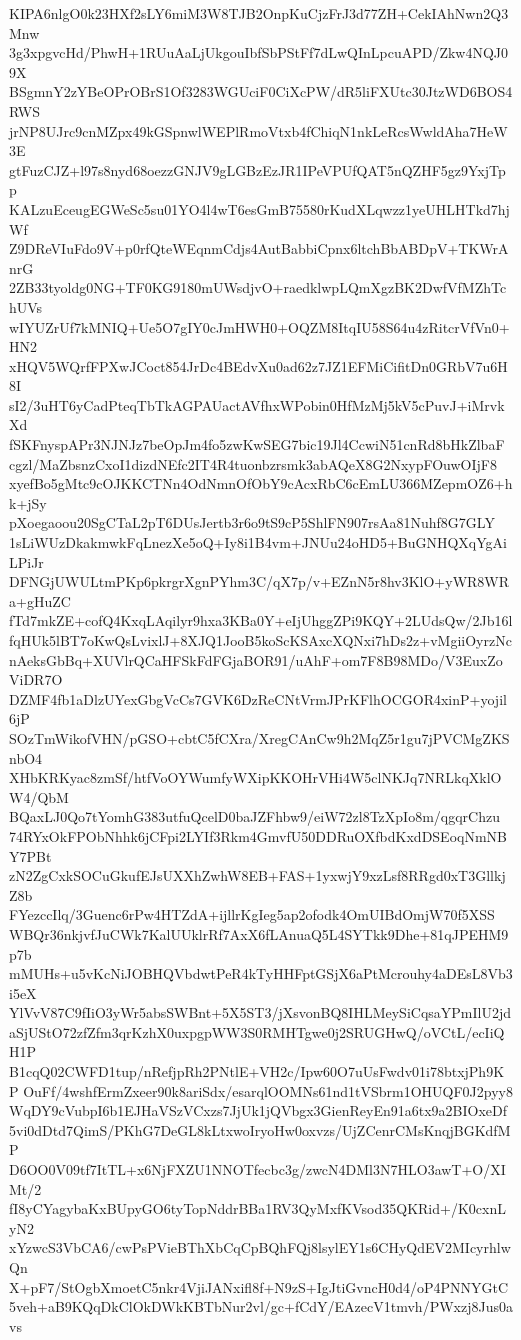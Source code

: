 KIPA6nlgO0k23HXf2sLY6miM3W8TJB2OnpKuCjzFrJ3d77ZH+CekIAhNwn2Q3Mnw
3g3xpgvcHd/PhwH+1RUuAaLjUkgouIbfSbPStFf7dLwQInLpcuAPD/Zkw4NQJ09X
BSgmnY2zYBeOPrOBrS1Of3283WGUciF0CiXcPW/dR5liFXUtc30JtzWD6BOS4RWS
jrNP8UJrc9cnMZpx49kGSpnwlWEPlRmoVtxb4fChiqN1nkLeRcsWwldAha7HeW3E
gtFuzCJZ+l97s8nyd68oezzGNJV9gLGBzEzJR1IPeVPUfQAT5nQZHF5gz9YxjTpp
KALzuEceugEGWeSc5su01YO4l4wT6esGmB75580rKudXLqwzz1yeUHLHTkd7hjWf
Z9DReVIuFdo9V+p0rfQteWEqnmCdjs4AutBabbiCpnx6ltchBbABDpV+TKWrAnrG
2ZB33tyoldg0NG+TF0KG9180mUWsdjvO+raedklwpLQmXgzBK2DwfVfMZhTchUVs
wIYUZrUf7kMNIQ+Ue5O7gIY0cJmHWH0+OQZM8ItqIU58S64u4zRitcrVfVn0+HN2
xHQV5WQrfFPXwJCoct854JrDc4BEdvXu0ad62z7JZ1EFMiCifitDn0GRbV7u6H8I
sI2/3uHT6yCadPteqTbTkAGPAUactAVfhxWPobin0HfMzMj5kV5cPuvJ+iMrvkXd
fSKFnyspAPr3NJNJz7beOpJm4fo5zwKwSEG7bic19Jl4CcwiN51cnRd8bHkZlbaF
cgzl/MaZbsnzCxoI1dizdNEfc2IT4R4tuonbzrsmk3abAQeX8G2NxypFOuwOIjF8
xyefBo5gMtc9cOJKKCTNn4OdNmnOfObY9cAcxRbC6cEmLU366MZepmOZ6+hk+jSy
pXoegaoou20SgCTaL2pT6DUsJertb3r6o9tS9cP5ShlFN907rsAa81Nuhf8G7GLY
1sLiWUzDkakmwkFqLnezXe5oQ+Iy8i1B4vm+JNUu24oHD5+BuGNHQXqYgAiLPiJr
DFNGjUWULtmPKp6pkrgrXgnPYhm3C/qX7p/v+EZnN5r8hv3KlO+yWR8WRa+gHuZC
fTd7mkZE+cofQ4KxqLAqilyr9hxa3KBa0Y+eIjUhggZPi9KQY+2LUdsQw/2Jb16l
fqHUk5lBT7oKwQsLvixlJ+8XJQ1JooB5koScKSAxcXQNxi7hDs2z+vMgiiOyrzNc
nAeksGbBq+XUVlrQCaHFSkFdFGjaBOR91/uAhF+om7F8B98MDo/V3EuxZoViDR7O
DZMF4fb1aDlzUYexGbgVcCs7GVK6DzReCNtVrmJPrKFlhOCGOR4xinP+yojil6jP
SOzTmWikofVHN/pGSO+cbtC5fCXra/XregCAnCw9h2MqZ5r1gu7jPVCMgZKSnbO4
XHbKRKyac8zmSf/htfVoOYWumfyWXipKKOHrVHi4W5clNKJq7NRLkqXklOW4/QbM
BQaxLJ0Qo7tYomhG383utfuQcelD0baJZFhbw9/eiW72zl8TzXpIo8m/qgqrChzu
74RYxOkFPObNhhk6jCFpi2LYIf3Rkm4GmvfU50DDRuOXfbdKxdDSEoqNmNBY7PBt
zN2ZgCxkSOCuGkufEJsUXXhZwhW8EB+FAS+1yxwjY9xzLsf8RRgd0xT3GllkjZ8b
FYezccIlq/3Guenc6rPw4HTZdA+ijllrKgIeg5ap2ofodk4OmUIBdOmjW70f5XSS
WBQr36nkjvfJuCWk7KalUUklrRf7AxX6fLAnuaQ5L4SYTkk9Dhe+81qJPEHM9p7b
mMUHs+u5vKcNiJOBHQVbdwtPeR4kTyHHFptGSjX6aPtMcrouhy4aDEsL8Vb3i5eX
YlVvV87C9fIiO3yWr5absSWBnt+5X5ST3/jXsvonBQ8IHLMeySiCqsaYPmIlU2jd
aSjUStO72zfZfm3qrKzhX0uxpgpWW3S0RMHTgwe0j2SRUGHwQ/oVCtL/ecIiQH1P
B1cqQ02CWFD1tup/nRefjpRh2PNtlE+VH2c/Ipw60O7uUsFwdv01i78btxjPh9KP
OuFf/4wshfErmZxeer90k8ariSdx/esarqlOOMNs61nd1tVSbrm1OHUQF0J2pyy8
WqDY9cVubpI6b1EJHaVSzVCxzs7JjUk1jQVbgx3GienReyEn91a6tx9a2BIOxeDf
5vi0dDtd7QimS/PKhG7DeGL8kLtxwoIryoHw0oxvzs/UjZCenrCMsKnqjBGKdfMP
D6OO0V09tf7ItTL+x6NjFXZU1NNOTfecbc3g/zwcN4DMl3N7HLO3awT+O/XIMt/2
fI8yCYagybaKxBUpyGO6tyTopNddrBBa1RV3QyMxfKVsod35QKRid+/K0cxnLyN2
xYzwcS3VbCA6/cwPsPVieBThXbCqCpBQhFQj8lsylEY1s6CHyQdEV2MIcyrhlwQn
X+pF7/StOgbXmoetC5nkr4VjiJANxifl8f+N9zS+IgJtiGvncH0d4/oP4PNNYGtC
5veh+aB9KQqDkClOkDWkKBTbNur2vl/gc+fCdY/EAzecV1tmvh/PWxzj8Jus0avs
